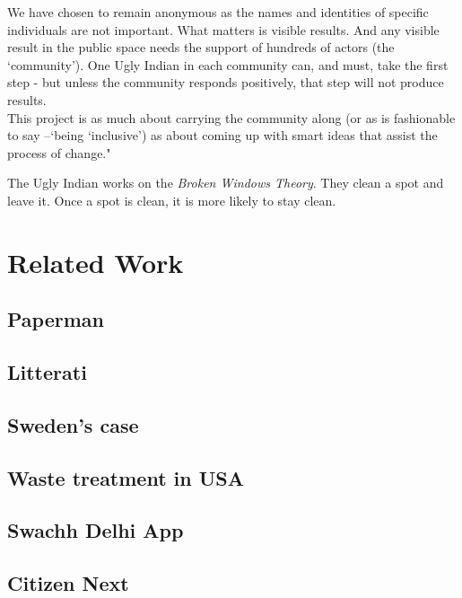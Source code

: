 \documentclass[10pt]{article}
\begin{document}
We have chosen to remain anonymous as the names and identities of specific individuals are not important. What matters is visible results. And any visible result in the public space needs the support of hundreds of actors (the ‘community’). One Ugly Indian in each community can, and must, take the first step - but unless the community responds positively, that step will not produce results.\\
This project is as much about carrying the community along (or as is fashionable to say –‘being ‘inclusive’) as about coming up with smart ideas that assist the process of change."

The Ugly Indian works on the \emph{Broken Windows Theory}. They clean a spot and leave it. Once a spot is clean, it is more likely to stay clean.

\section{Related Work}



\subsection {Paperman}



\subsection{Litterati}

\subsection{Sweden's case}

\subsection{Waste treatment in USA}

\subsection{Swachh Delhi App}

\subsection{Citizen Next}



\end{document}
